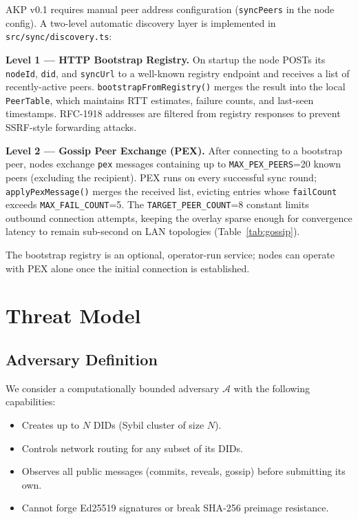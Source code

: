 \documentclass[10pt,twocolumn]{article}
\begin{document}
AKP v0.1 requires manual peer address configuration (\texttt{syncPeers}
in the node config). A two-level automatic discovery layer is implemented
in \texttt{src/sync/discovery.ts}:

\textbf{Level 1 — HTTP Bootstrap Registry.} On startup the node POSTs its
\texttt{nodeId}, \texttt{did}, and \texttt{syncUrl} to a well-known
registry endpoint and receives a list of recently-active peers.
\texttt{bootstrapFromRegistry()} merges the result into the local
\texttt{PeerTable}, which maintains RTT estimates, failure counts, and
last-seen timestamps. RFC-1918 addresses are filtered from registry
responses to prevent SSRF-style forwarding attacks.

\textbf{Level 2 — Gossip Peer Exchange (PEX).} After connecting to a
bootstrap peer, nodes exchange \texttt{pex} messages containing up to
\texttt{MAX\_PEX\_PEERS}=20 known peers (excluding the recipient). PEX
runs on every successful sync round; \texttt{applyPexMessage()} merges
the received list, evicting entries whose \texttt{failCount} exceeds
\texttt{MAX\_FAIL\_COUNT}=5. The \texttt{TARGET\_PEER\_COUNT}=8 constant
limits outbound connection attempts, keeping the overlay sparse enough
for convergence latency to remain sub-second on LAN topologies
(Table~\ref{tab:gossip}).

The bootstrap registry is an optional, operator-run service; nodes can
operate with PEX alone once the initial connection is established.

\section{Threat Model}

\subsection{Adversary Definition}

We consider a computationally bounded adversary $\mathcal{A}$ with the
following capabilities:
\begin{itemize}[noitemsep,topsep=2pt]
  \item Creates up to $N$ DIDs (Sybil cluster of size $N$).
  \item Controls network routing for any subset of its DIDs.
  \item Observes all public messages (commits, reveals, gossip) before
        submitting its own.
  \item Cannot forge Ed25519 signatures or break SHA-256 preimage resistance.
\end{itemize}
\end{document}
